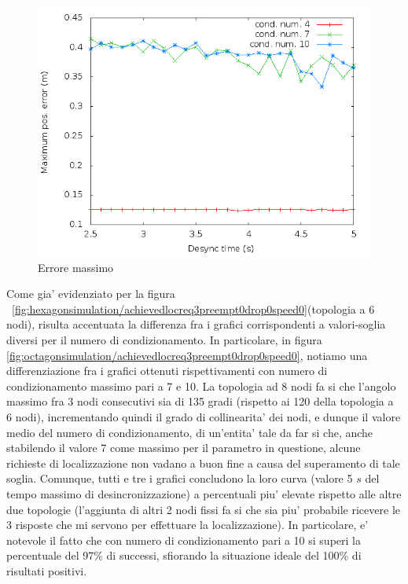 \begin{figure}[H]
    \centering
    \includegraphics[scale=0.5]{octagonsimulation/maxposerrorreq3preempt0drop0speed0.png}
    \caption{Errore massimo}
    \label{fig:octagonsimulation/maxposerrorreq3preempt0drop0speed0}
\end{figure}
Come gia' evidenziato per la figura ~\ref{fig:hexagonsimulation/achievedlocreq3preempt0drop0speed0}(topologia a 6 nodi), risulta accentuata la differenza fra i grafici corrispondenti a valori-soglia diversi per il numero di condizionamento. In particolare, in figura \ref{fig:octagonsimulation/achievedlocreq3preempt0drop0speed0}, notiamo una differenziazione fra i grafici ottenuti rispettivamenti con numero di condizionamento massimo pari a 7 e 10. La topologia ad 8 nodi fa si che l'angolo massimo fra 3 nodi consecutivi sia di 135 gradi (rispetto ai 120 della topologia a 6 nodi), incrementando quindi il grado di collinearita' dei nodi, e dunque il valore medio del numero di condizionamento, di un'entita' tale da far si che, anche stabilendo il valore 7 come massimo per il parametro in questione, alcune richieste di localizzazione non vadano a buon fine a causa del superamento di tale soglia.
Comunque, tutti e tre i grafici concludono la loro curva (valore 5 $s$ del tempo massimo di desincronizzazione) a percentuali piu' elevate rispetto alle altre due topologie (l'aggiunta di altri 2 nodi fissi fa si che sia piu' probabile ricevere le 3 risposte che mi servono per effettuare la localizzazione). In particolare, e' notevole il fatto che  con numero di condizionamento pari a 10 si superi la percentuale del 97\% di successi, sfiorando la situazione ideale del 100\% di risultati positivi.
